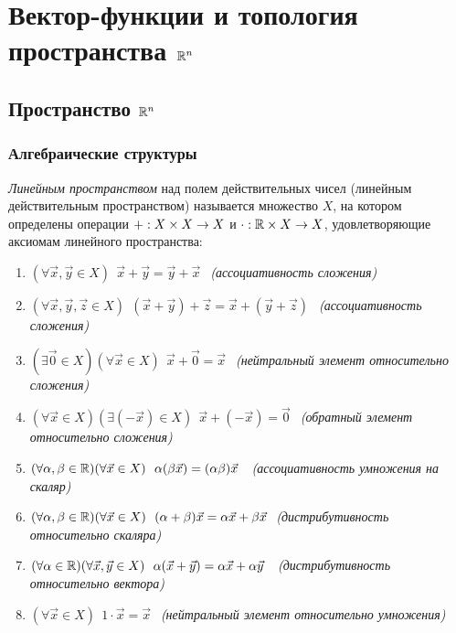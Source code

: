 \section{Вектор-функции и топология пространства $\mathbb{R}^n$}

\subsection{Пространство $\mathbb{R}^n$}

\subsubsection*{Алгебраические структуры}

\begin{definition}
	\textit{Линейным пространством} над полем действительных
	чисел (линейным действительным пространством) называется
	множество $X$, на котором определены операции
	$+: X \times X \rightarrow X$ и $\cdot: \mathbb{R} \times X \rightarrow X$,
	удовлетворяющие аксиомам линейного пространства:
	\begin{enumerate}
		\item $(\forall \vec{x}, \vec{y} \in X)\ \ \vec{x} + \vec{y}
			= \vec{y} + \vec{x}\ \ $ \textit{(ассоциативность сложения)}
		
		\item $(\forall \vec{x}, \vec{y}, \vec{z} \in X)\ \ 
			(\vec{x} + \vec{y}) + \vec{z} = \vec{x} + 
			(\vec{y} + \vec{z})\ \ $ \textit{(ассоциативность сложения)}
		
		\item $(\exists \vec{0} \in X)(\forall \vec{x} \in X)
			\ \ \vec{x} + \vec{0} = \vec{x}\ \ $ \textit{(нейтральный 
			элемент относительно сложения)}
		
		\item $(\forall \vec{x} \in X)(\exists
			(-\vec{x}) \in X)\ \ \vec{x} + (-\vec{x}) = \vec{0}\ \ $
			\textit{(обратный элемент относительно сложения)}
		
		\item $(\forall \alpha, \beta \in \mathbb{R})(\forall
			\vec{x} \in X)\ \ \alpha(\beta \vec{x}) =
			(\alpha \beta) \vec{x}\ \ $ \textit{(ассоциативность
			умножения на скаляр)}
		
		\item $(\forall \alpha, \beta \in \mathbb{R})(\forall \vec{x}
			\in X)\ \ (\alpha + \beta) \vec{x} =
			\alpha \vec{x} + \beta \vec{x}\ $ \textit{(дистрибутивность
			относительно скаляра)}
		
		\item $(\forall \alpha \in \mathbb{R})(\forall \vec{x},
			\vec{y} \in X)\ \ \alpha(\vec{x} + \vec{y}) =
			\alpha\vec{x} + \alpha\vec{y}\ \ $ \textit{(дистрибутивность
			относительно вектора)}
		
		\item $(\forall \vec{x} \in X)\ \ 1 \cdot \vec{x} = \vec{x}\ \ $
			\textit{(нейтральный элемент относительно умножения)}
	\end{enumerate}
\end{definition}

